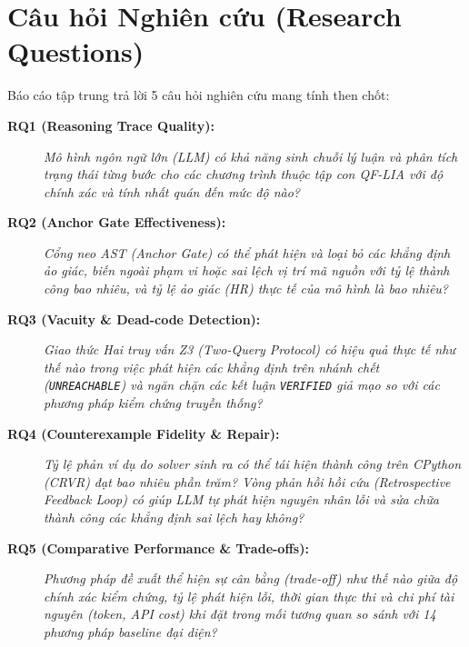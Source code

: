 \section{Câu hỏi Nghiên cứu (Research Questions)}
\label{sec:research_questions}
Báo cáo tập trung trả lời 5 câu hỏi nghiên cứu mang tính then chốt:

\begin{description}
    \item[\textbf{RQ1 (Reasoning Trace Quality):}] \textit{Mô hình ngôn ngữ lớn (LLM) có khả năng sinh chuỗi lý luận và phân tích trạng thái từng bước cho các chương trình thuộc tập con QF-LIA với độ chính xác và tính nhất quán đến mức độ nào?}
    \item[\textbf{RQ2 (Anchor Gate Effectiveness):}] \textit{Cổng neo AST (Anchor Gate) có thể phát hiện và loại bỏ các khẳng định ảo giác, biến ngoài phạm vi hoặc sai lệch vị trí mã nguồn với tỷ lệ thành công bao nhiêu, và tỷ lệ ảo giác (HR) thực tế của mô hình là bao nhiêu?}
    \item[\textbf{RQ3 (Vacuity \& Dead-code Detection):}] \textit{Giao thức Hai truy vấn Z3 (Two-Query Protocol) có hiệu quả thực tế như thế nào trong việc phát hiện các khẳng định trên nhánh chết (\texttt{UNREACHABLE}) và ngăn chặn các kết luận \texttt{VERIFIED} giả mạo so với các phương pháp kiểm chứng truyền thống?}
    \item[\textbf{RQ4 (Counterexample Fidelity \& Repair):}] \textit{Tỷ lệ phản ví dụ do solver sinh ra có thể tái hiện thành công trên CPython (CRVR) đạt bao nhiêu phần trăm? Vòng phản hồi hồi cứu (Retrospective Feedback Loop) có giúp LLM tự phát hiện nguyên nhân lỗi và sửa chữa thành công các khẳng định sai lệch hay không?}
    \item[\textbf{RQ5 (Comparative Performance \& Trade-offs):}] \textit{Phương pháp đề xuất thể hiện sự cân bằng (trade-off) như thế nào giữa độ chính xác kiểm chứng, tỷ lệ phát hiện lỗi, thời gian thực thi và chi phí tài nguyên (token, API cost) khi đặt trong mối tương quan so sánh với 14 phương pháp baseline đại diện?}
\end{description}

